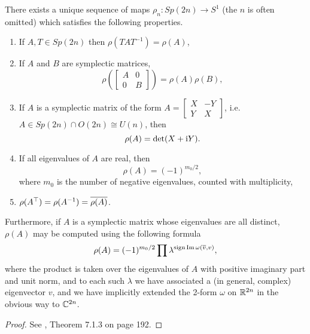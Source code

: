 \begin{theorem}\label{rhodef}
There exists a unique sequence of maps $\rho_n \colon Sp(2n) \to S^1$ (the $n$ is often omitted) which satisfies the following properties.
\begin{enumerate}[label=\roman*)]
\item If $A, T \in Sp(2n)$ then $\rho(T A T^{-1}) = \rho(A)$,
\item If $A$ and $B$ are symplectic matrices,
\begin{equation}
\rho\left(\begin{bmatrix} A & 0 \\ 0 & B \end{bmatrix}\right) = \rho(A) \rho(B),
\end{equation}
\item\label{rhodef:xy} If $A$ is a symplectic matrix of the form $A = \begin{bmatrix} X & -Y \\ Y & X \end{bmatrix}$, i.e. $A \in Sp(2n) \cap O(2n) \cong U(n)$, then
\begin{equation}
\rho(A) = \det(X + \mathrm{i} Y).
\end{equation}
\item\label{rhodef:realev} If all eigenvalues of $A$ are real, then
\begin{equation}
\rho(A) = (-1)^{m_0/2},
\end{equation}
where $m_0$ is the number of negative eigenvalues, counted with multiplicity,
\item $\rho(A^\top) = \rho(A^{-1}) = \overline{\rho(A)}$.
\end{enumerate}

Furthermore, if $A$ is a symplectic matrix whose eigenvalues are all distinct, $\rho(A)$ may be computed using the following formula
\begin{equation}\label{rhoformula}
\rho(A) = (-1)^{m_0/2} \prod \lambda^{\operatorname{sign} \operatorname{Im} \omega(\overline{v}, v)},
\end{equation}
where the product is taken over the eigenvalues of $A$ with positive imaginary part and unit norm, and to each such $\lambda$ we have associated  a (in general, complex) eigenvector $v$, and we have implicitly extended the 2-form $\omega$ on $\mathbb{R}^{2n}$ in the obvious way to $\mathbb{C}^{2n}$.
\end{theorem}

\begin{proof}
See \cite{audin}, Theorem 7.1.3 on page 192.
\end{proof}

